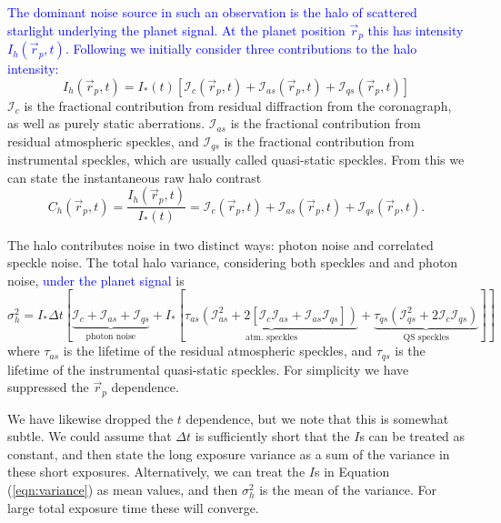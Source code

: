 \documentclass[10pt,preprint]{aastex631}
\newcommand{\jrmadd}[1]{\textcolor{blue}{#1}}
\begin{document}
\jrmadd{The dominant noise source in such an observation is the halo of scattered starlight underlying the planet signal.  At the planet position $\vec{r}_p$ this has intensity $I_h(\vec{r}_p,t)$. Following \citet{2007ApJ...669..642S} we initially consider three contributions to the halo intensity:}
\begin{equation}
I_h(\vec{r}_p,t) = I_{*}(t)\left[\mathcal{I}_c(\vec{r}_p,t) + \mathcal{I}_{as}(\vec{r}_p,t) + \mathcal{I}_{qs}(\vec{r}_p,t)\right]
\end{equation}
$\mathcal{I}_c$ is the fractional contribution from residual diffraction from the coronagraph, as well as purely static aberrations.  $\mathcal{I}_{as}$ is the fractional contribution from residual atmospheric speckles, and $\mathcal{I}_{qs}$ is the fractional contribution from instrumental speckles, which are usually called quasi-static speckles.  
From this we can state the instantaneous raw halo contrast
\begin{equation}
C_h(\vec{r}_p,t) = \frac{I_h(\vec{r}_p,t)}{I_*(t)} = \mathcal{I}_c(\vec{r}_p,t) + \mathcal{I}_{as}(\vec{r}_p,t) + \mathcal{I}_{qs}(\vec{r}_p,t).
\end{equation}

The halo contributes noise in two distinct ways: photon noise and correlated speckle noise. The total halo variance, considering both speckles and and photon noise, \jrmadd{under the planet signal} is \citep{2007ApJ...669..642S} 
\begin{equation}
\sigma^2_{h}  = I_* \Delta t [\underbrace{\mathcal{I}_c + \mathcal{I}_{as} + \mathcal{I}_{qs}}_{\mbox{photon noise}} + I_* [ \underbrace{\tau_{as}\left(\mathcal{I}_{as}^2 + 2[\mathcal{I}_c\mathcal{I}_{as} + \mathcal{I}_{as}\mathcal{I}_{qs}]  \right)}_{\mbox{atm. speckles}} +  \underbrace{\tau_{qs}\left( \mathcal{I}_{qs}^2 + 2 \mathcal{I}_c \mathcal{I}_{qs}\right)}_{\mbox{QS speckles}}]]
\label{eqn:variance}
\end{equation}
where $\tau_{as}$ is the lifetime of the residual atmospheric speckles, and $\tau_{qs}$ is the lifetime of the instrumental quasi-static speckles.  For simplicity we have suppressed the $\vec{r}_p$ dependence.   

We have likewise dropped the $t$ dependence, but we note that this is somewhat subtle.  We could assume that $\Delta t$ is sufficiently short that the $I$s can be treated as constant, and then state the long exposure variance as a sum of the variance in these short exposures.  Alternatively, we can treat the $I$s in Equation (\ref{eqn:variance}) as mean values, and then $\sigma^2_{h}$ is the mean of the variance.  For large total exposure time these will converge.
\end{document}
